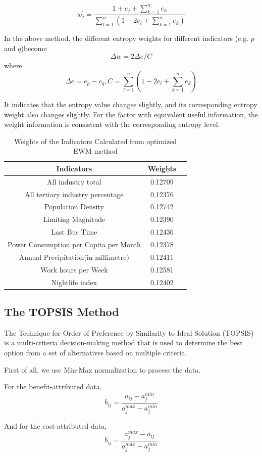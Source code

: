 $$w_j^{'}=\frac{1+e_j+\sum_{k=1}^ne_k}{\sum_{l=1}^n(1-2e_l+\sum_{k=1}^ne_k)}$$

In the above method, the different entropy weights for different indicators (e.g. $p$ and $q$)become $$\Delta w=2\Delta e/C$$ where $$\Delta e=e_p-e_q,C=\sum_{l=1}^n(1-2e_l+\sum_{k=1}^ne_k)$$

It indicates that the entropy value changes slightly, and its corresponding entropy weight also changes slightly. For the factor with equivalent useful information, the weight information is consistent with the corresponding entropy level.


\begin{table}[H] \centering
    \caption{Weights of the Indicators Calculated from optimized EWM method}
    \begin{tabular}{ccl}
        \toprule
        Indicators & Weights\\ \hline
        All industry total & 0.12709\\
        All tertiary industry percentage & 0.12376\\
        Population Density & 0.12742\\
        Limiting Magnitude & 0.12390\\
        Last Bus Time & 0.12436\\
        Power Consumption per Capita per Month & 0.12378\\
        Annual Precipitation(in millimetre) & 0.12411\\
        Work hours per Week & 0.12581\\
        Nightlife index & 0.12402\\
        \bottomrule
    \end{tabular}
\end{table}


\subsection{The TOPSIS Method}

The Technique for Order of Preference by Similarity to Ideal Solution (TOPSIS) is a multi-criteria decision-making method that is used to determine the best option from a set of alternatives based on multiple criteria. 

First of all, we use Min-Max normalization to process the data.

For the benefit-attributed data,
$$b_{ij}=\frac{a_{ij}-a_j^{min}}{a_j^{max}-a_j^{min}}$$

And for the cost-attributed data,
$$b_{ij}=\frac{a_{j}^{max}-a_{ij}}{a_j^{max}-a_j^{min}}$$

